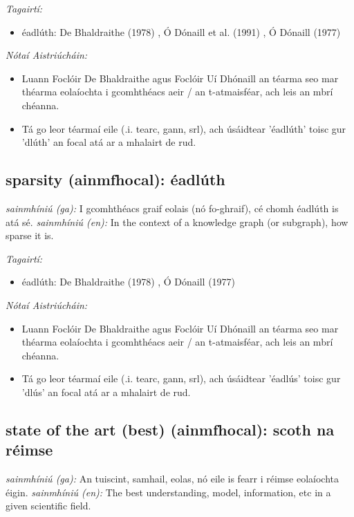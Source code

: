\documentclass{article}
\begin{document}
 \noindent \textit{Tagairtí:}
\begin{itemize}
	\item éadlúth: De Bhaldraithe (1978) \cite{de-bhaldraithe}, Ó Dónaill et al. (1991) \cite{focloir-beag}, Ó Dónaill (1977) \cite{odonaill}
\end{itemize}

 \noindent \textit{Nótaí Aistriúcháin:}
\begin{itemize}
	\item Luann Foclóir De Bhaldraithe agus Foclóir Uí Dhónaill an téarma seo mar théarma eolaíochta i gcomhthéacs aeir / an t-atmaisféar, ach leis an mbrí chéanna.
	\item Tá go leor téarmaí eile (.i. tearc, gann, srl), ach úsáidtear 'éadlúth' toisc gur 'dlúth' an focal atá ar a mhalairt de rud.
\end{itemize}


\subsection*{sparsity (ainmfhocal): éadlúth} 
 \noindent \textit{sainmhíniú (ga):} I gcomhthéacs graif eolais (nó fo-ghraif), cé chomh éadlúth is atá sé.
\newline\newline
 \noindent \textit{sainmhíniú (en):} In the context of a knowledge graph (or subgraph), how sparse it is.
\newline

 \noindent \textit{Tagairtí:}
\begin{itemize}
	\item éadlúth: De Bhaldraithe (1978) \cite{de-bhaldraithe}, Ó Dónaill (1977) \cite{odonaill}
\end{itemize}

 \noindent \textit{Nótaí Aistriúcháin:}
\begin{itemize}
	\item Luann Foclóir De Bhaldraithe agus Foclóir Uí Dhónaill an téarma seo  mar théarma eolaíochta i gcomhthéacs aeir / an t-atmaisféar, ach leis an mbrí chéanna.
	\item Tá go leor téarmaí eile (.i. tearc, gann, srl), ach úsáidtear 'éadlús' toisc gur 'dlús' an focal atá ar a mhalairt de rud.
\end{itemize}


\subsection*{state of the art (best) (ainmfhocal): scoth na réimse} 
 \noindent \textit{sainmhíniú (ga):} An tuiscint, samhail, eolas, nó eile is fearr i réimse eolaíochta éigin.
\newline\newline
 \noindent \textit{sainmhíniú (en):} The best understanding, model, information, etc in a given scientific field.
\newline
\end{document}
